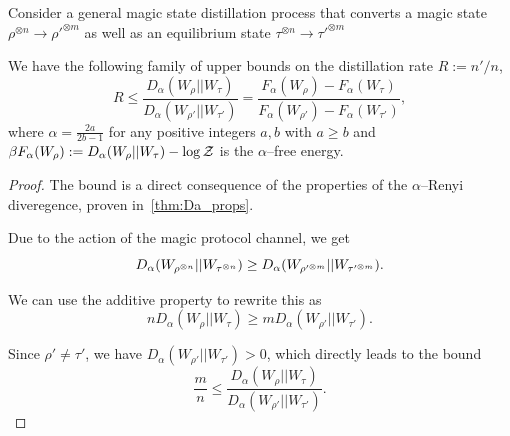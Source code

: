 \documentclass[pra,
aps,
twocolumn,
superscriptaddress,
groupedaddress,
nofootinbib,
reprint
]{revtex4-1}
\begin{document}
\begingroup
\def\thetheorem{\ref{thm:entropic_bounds}}
\begin{theorem}
	Consider a general magic state distillation process that converts a magic state $\rho^{\otimes n} \longrightarrow \rho'^{\otimes m}$ as well as an equilibrium state $\tau^{\otimes n} \longrightarrow \tau'^{\otimes m}$
	
	We have the following family of upper bounds on the distillation rate $R := n'/n$,
	\begin{equation}
		R \leq \frac{D_{\alpha}(W_\rho||W_\tau)}{D_{\alpha}(W_{\rho'}||W_{\tau'})} = \frac{F_\alpha(W_\rho) - F_\alpha(W_\tau)}{F_\alpha(W_{\rho'}) - F_\alpha(W_{\tau'})},
	\end{equation}
	where $\alpha = \frac{2a}{2b-1}$ for any positive integers $a,b$ with $a \geq b$ and $\beta F_\alpha(W_\rho) := D_\alpha (W_\rho || W_\tau) - \log \mathcal{Z}$ is the $\alpha$--free energy. 
\end{theorem}
\addtocounter{theorem}{-1}
\endgroup
\begin{proof}
	The bound is a direct consequence of the properties of the $\alpha$--Renyi diveregence, proven in~\cref{thm:Da_props}.
	
Due to the action of the magic protocol channel, we get
\begin{equation}	
	D_\alpha(W_{\rho^{\otimes n}} || W_{\tau^{\otimes n}}) \geq D_\alpha (W_{\rho'^{\otimes m}} || W_{\tau'^{\otimes m}}).\vspace{10pt}
\end{equation}

We can use the additive property to rewrite this as
\begin{equation}
	n D_\alpha(W_\rho || W_\tau) \geq m D_\alpha(W_{\rho'} || W_{\tau'}).
\end{equation}

Since $\rho' \neq \tau'$, we have $D_\alpha(W_{\rho'} || W_{\tau'}) > 0$, which directly leads to the bound
\begin{equation}
	\frac{m}{n} \leq \frac{D_{\alpha}(W_\rho||W_\tau)}{D_{\alpha}(W_{\rho'}||W_{\tau'})}.
\end{equation}
\end{proof}
\end{document}
